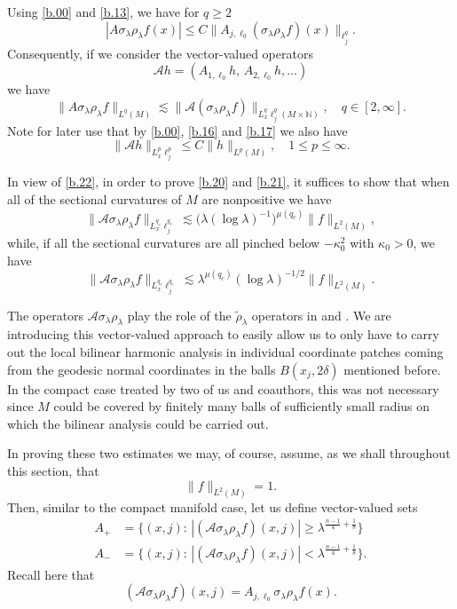 \documentclass[10pt]{amsart}
\newcommand{\la}{\lambda}
\newcommand{\1}{{\bf 1}}
\newcommand{\A}{{\mathcal A}}
\newcommand{\N}{{\mathbb N}}
\begin{document}
Using \eqref{b.00} and \eqref{b.13}, we have for $q\ge 2$
$$|A\sigma_\la \rho_\la f(x)|\le C\|A_{j,\ell_0}(\sigma_\la \rho_\la f)(x)\|_{\ell^q_j}.$$
Consequently, if we consider the vector-valued operators
\begin{equation}\label{b.211}
\A h=(A_{1,\ell_0}h, \, A_{2,\ell_0}h,\dots)
\end{equation}
we have
\begin{equation}\label{b.22}
\|A\sigma_\la \rho_\la f\|_{L^q(M)}\lesssim
\| \A(\sigma_\la \rho_\la f)\|_{L^q_x \ell^q_j(M\times \N)}, \quad q\in [2,\infty].
\end{equation}
Note for later use that by \eqref{b.00}, \eqref{b.16} and \eqref{b.17} we also have 
\begin{equation}\label{b.23}
\| \A h\|_{L^p_x\ell^p_j}\le C\|h\|_{L^p(M)}, \quad 1\le p\le \infty.
\end{equation}


In view of \eqref{b.22}, in order to prove \eqref{b.20} and \eqref{b.21}, it suffices to show that when
all of the sectional curvatures of $M$ are nonpositive
we have
\begin{equation}\label{b.24}
\| \A \sigma_\la \rho_\la f\|_{L^{q_c}_x\ell^{q_c}_j} \lesssim 
\bigl(\la(\log\la)^{-1}\bigr)^{\mu(q_c)} \|f\|_{L^2(M)},
\end{equation}
while, if all the sectional curvatures are all pinched below $-\kappa^2_0$ with $\kappa_0>0$, we have
\begin{equation}\label{b.25}
\| \A\sigma_\la \rho_\la f \|_{L^{q_c}_x\ell^{q_c}_j}  \lesssim  \la^{\mu(q_c)}(\log\la)^{-1/2} \|f\|_{L^2(M)}.
\end{equation}


The operators $\A \sigma_\la \rho_\la$ play the role of the $\tilde \rho_\la$ operators in \cite{SBLOg} and \cite{HSp}.
We are introducing this vector-valued approach to easily allow us to only have to carry out the local bilinear harmonic analysis
in individual coordinate patches coming from the geodesic normal coordinates in the balls $B(x_j,2\delta)$ mentioned
before.  In the compact case treated by two of us and coauthors, this was not necessary since $M$ could be covered
by finitely many balls of sufficiently small radius on which the bilinear analysis could be carried out.


In proving these two estimates we may, of course, assume,
as we shall throughout this section, that
\begin{equation}\label{b.norm}
\|f\|_{L^2(M)}=1.
\end{equation}
Then, similar to the compact manifold case, let us
define vector-valued sets
\begin{equation}\label{b.26}
\begin{split}
A_+&= \{(x,j): \, |(\A \sigma_\la \rho_\la f)
(x,j)|\ge \la^{\frac{n-1}4+\frac18}\}
\\
A_-&=\{(x,j): \, |(\A \sigma_\la \rho_\la f)
(x,j)|< \la^{\frac{n-1}4+\frac18}\}.
\end{split}
\end{equation}
Recall here that
\begin{equation}\label{b.27}
(\A \sigma_\la\rho_\la f)(x,j)=A_{j,\ell_0}
\sigma_\la \rho_\la f(x).
\end{equation}
\end{document}

